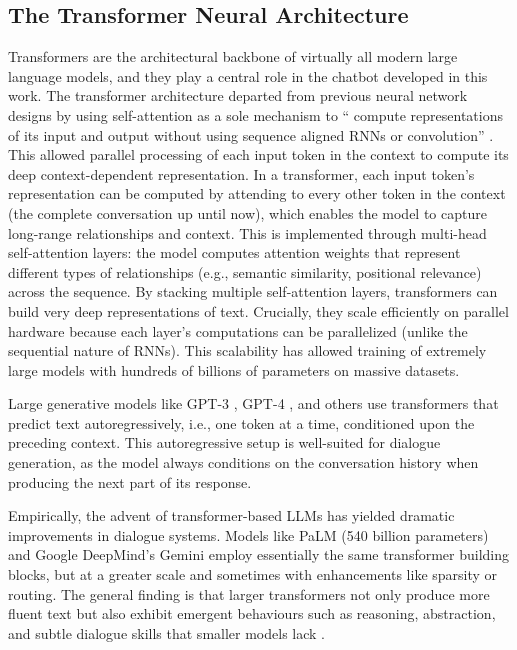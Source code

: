 \subsection{The Transformer Neural Architecture}
\label{ssec:transformers} 
Transformers are the architectural backbone of virtually all modern large language models, and they play a central role in the chatbot developed in this work. The transformer architecture \cite{vaswani2017attention} departed from previous neural network designs by using self-attention as a sole mechanism to `` compute representations of its input and output without using sequence aligned RNNs or convolution'' \cite{vaswani2017attention}. This allowed parallel processing of each input token in the context to compute its deep context-dependent representation. In a transformer, each input token's representation can be computed by attending to every other token in the context (the complete conversation up until now), which enables the model to capture long-range relationships and context. This is implemented through multi-head self-attention layers: the model computes attention weights that represent different types of relationships (e.g., semantic similarity, positional relevance) across the sequence. By stacking multiple self-attention layers, transformers can build very deep representations of text. Crucially, they scale efficiently on parallel hardware because each layer's computations can be parallelized (unlike the sequential nature of RNNs). This scalability has allowed training of extremely large models with hundreds of billions of parameters on massive datasets.



Large generative models like GPT-3 \cite{brown2020language}, GPT-4 \cite{openai2023gpt4}, and others use transformers that predict text autoregressively, i.e., one token at a time, conditioned upon the preceding context. This autoregressive setup is well-suited for dialogue generation, as the model always conditions on the conversation history when producing the next part of its response.


Empirically, the advent of transformer-based LLMs has yielded dramatic improvements in dialogue systems. Models like PaLM \cite{chowdhery2022palm} (540 billion parameters) and Google DeepMind's Gemini \cite{geminiteam2025geminifamilyhighlycapable} employ essentially the same transformer building blocks, but at a greater scale and sometimes with enhancements like sparsity or routing. The general finding is that larger transformers not only produce more fluent text but also exhibit emergent behaviours such as reasoning, abstraction, and subtle dialogue skills that smaller models lack \cite{52065,berti2025emergentabilitieslargelanguage}.


